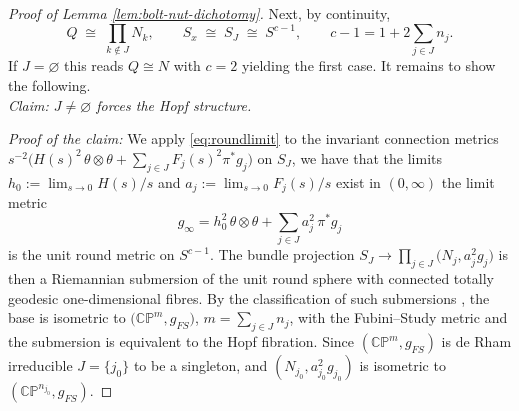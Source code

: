 \documentclass[11pt]{amsart}
\theoremstyle{plain}
\numberwithin{equation}{section}
\theoremstyle{definition}
\theoremstyle{remark}
\begin{document}
\begin{proof}[Proof of Lemma \ref{lem:bolt-nut-dichotomy}]
Next, by continuity, %
\[
Q \;\cong\; \prod_{k \notin J} N_k , \qquad
S_x \;\cong\; S_J \;\cong\; S^{c-1}, \qquad c - 1 = 1 + 2 \textstyle\sum_{j \in J} n_j .
\]
If $J = \varnothing$ this reads $Q \cong N$ with $c = 2$ yielding the first case. It remains to show the following.\\ 

\emph{Claim: $J \neq \varnothing$ forces the Hopf structure.}

\emph{Proof of the claim:} We apply \eqref{eq:roundlimit} to the invariant connection metrics
$s^{-2}\big( H(s)^2\, \theta \otimes \theta + \sum_{j \in J} F_j(s)^2 \pi^* g_j \big)$
on $S_J$, we have that the limits $h_0 := \lim_{s\to0} H(s)/s$ and
$a_j := \lim_{s\to0} F_j(s)/s$ exist in $(0,\infty)$ %
the limit metric
$$\widehat{g}_\infty = h_0^2\, \theta \otimes \theta + \sum_{j \in J} a_j^2\, \pi^* g_j$$
is the unit round metric on $S^{c-1}$. The bundle projection
$S_J \to \prod_{j \in J} \big( N_j, a_j^2 g_j \big)$ is then a Riemannian
submersion of the unit round sphere with connected totally geodesic
one-dimensional fibres. %
By the classification of such submersions \cite{Escobales, Ranjan}, the base is isometric to
$\big( \mathbb{CP}^{m}, g_{FS} \big)$, $m = \sum_{j \in J} n_j$, with the
Fubini--Study metric %
and the submersion is equivalent to the Hopf fibration.  Since
$(\mathbb{CP}^m, g_{FS})$ is de Rham irreducible %
$J = \{ j_0 \}$ to be a singleton, and
$(N_{j_0}, a_{j_0}^2 g_{j_0})$ is isometric to
$(\mathbb{CP}^{n_{j_0}}, g_{FS})$. 


\end{proof}
\end{document}
